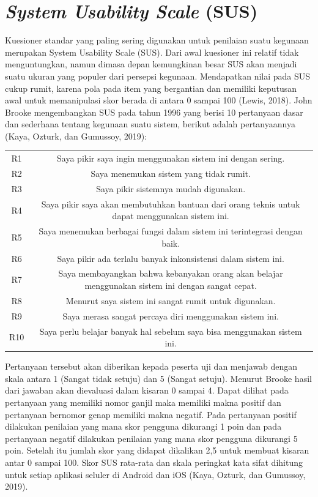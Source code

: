 \section{\textit{System Usability Scale }(SUS)}
Kuesioner standar yang paling sering digunakan untuk penilaian suatu kegunaan merupakan System Usability Scale (SUS). Dari awal kuesioner ini relatif tidak menguntungkan, namun dimasa depan kemungkinan besar SUS akan menjadi suatu ukuran yang populer dari persepsi kegunaan. Mendapatkan nilai pada SUS cukup rumit, karena pola pada item yang bergantian dan memiliki keputusan awal untuk memanipulasi skor berada di antara 0 sampai 100 (Lewis, 2018). John Brooke mengembangkan SUS pada tahun 1996 yang berisi 10 pertanyaan dasar dan sederhana tentang kegunaan suatu sistem, berikut adalah pertanyaannya  (Kaya, Ozturk, dan Gumussoy, 2019):
\begin{center}
\begin{tabular}{ |c|c| } 
 \hline
 R1 & Saya pikir saya ingin menggunakan sistem ini dengan sering.\\
 R2 & Saya menemukan sistem yang tidak rumit.\\
 R3 & Saya pikir sistemnya mudah digunakan.\\
 R4 & Saya pikir saya akan membutuhkan bantuan dari orang teknis untuk dapat menggunakan sistem ini.\\
 R5 & Saya menemukan berbagai fungsi dalam sistem ini terintegrasi dengan baik.\\
 R6 & Saya pikir ada terlalu banyak inkonsistensi dalam sistem ini.\\
 R7 & Saya membayangkan bahwa kebanyakan orang akan belajar menggunakan sistem ini dengan sangat cepat.\\
 R8 & Menurut saya sistem ini sangat rumit untuk digunakan.\\
 R9 & Saya merasa sangat percaya diri menggunakan sistem ini.\\
 R10 & Saya perlu belajar banyak hal sebelum saya bisa menggunakan sistem ini.\\
 \hline
\end{tabular}
\end{center}

\par Pertanyaan tersebut akan diberikan kepada peserta uji dan menjawab dengan skala antara 1 (Sangat tidak setuju) dan 5 (Sangat setuju). Menurut Brooke hasil dari jawaban akan dievaluasi dalam kisaran 0 sampai 4. Dapat dilihat pada pertanyaan yang memiliki nomor ganjil maka memiliki makna positif dan pertanyaan bernomor genap memiliki makna negatif. Pada pertanyaan positif dilakukan penilaian yang mana skor pengguna dikurangi 1 poin dan pada pertanyaan negatif dilakukan penilaian yang mana skor pengguna dikurangi 5 poin. Setelah itu jumlah skor yang didapat dikalikan 2,5 untuk membuat kisaran antar 0 sampai 100. Skor SUS rata-rata dan skala peringkat kata sifat dihitung untuk setiap aplikasi seluler di Android dan iOS (Kaya, Ozturk, dan Gumussoy, 2019).

